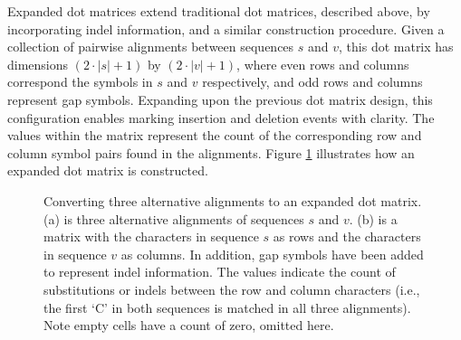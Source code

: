 
Expanded dot matrices extend traditional dot matrices, described above, by incorporating indel information, and a similar construction procedure. Given a collection of pairwise alignments between sequences $s$ and $v$, this dot matrix has dimensions $(2\cdot|s|+1)$ by $(2\cdot|v|+1)$, where even rows and columns correspond the symbols in $s$ and $v$ respectively, and odd rows and columns represent gap symbols. Expanding upon the previous dot matrix design, this configuration enables marking insertion and deletion events with clarity. The values within the matrix represent the count of the corresponding row and column symbol pairs found in the alignments. Figure \ref{fig:aln2matrix-expanded} illustrates how an expanded dot matrix is constructed.

\begin{figure}[!hbt]
    \centering
    \begin{subfigure}[c]{0.2\textwidth}
        \centering
        \vspace*{1em}\hspace*{-2em}
        \vspace*{1em}\caption{}
     \end{subfigure}
     \hspace{6em}
    \begin{subfigure}[c]{0.5\textwidth}
        \centering
        \resizebox{1.15\textwidth}{!}{}
        \caption{}
     \end{subfigure}
    \caption[Alignment to Expanded Dot Matrix]{Converting three alternative alignments to an expanded dot matrix. (a) is three alternative alignments of sequences $s$ and $v$. (b) is a matrix with the characters in sequence $s$ as rows and the characters in sequence $v$ as columns. In addition, gap symbols have been added to represent indel information. The values indicate the count of substitutions or indels between the row and column characters (i.e., the first `C' in both sequences is matched in all three alignments). Note empty cells have a count of zero, omitted here.}
    \label{fig:aln2matrix-expanded}
\end{figure}


